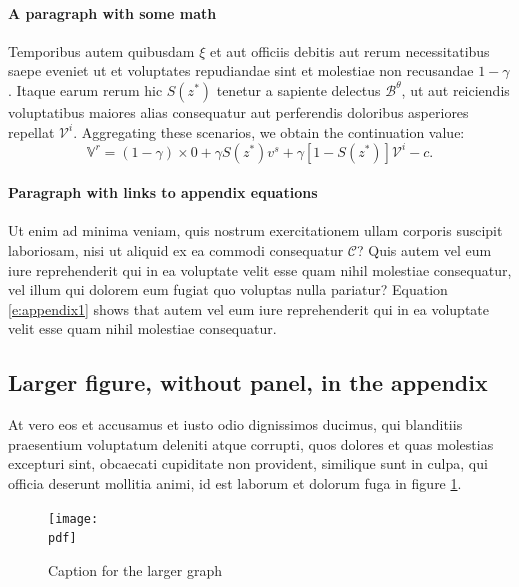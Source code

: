\documentclass[letterpaper,12pt,leqno]{article}
\newcommand{\pdf}{figures.pdf}
\begin{document}
\paragraph{A paragraph with some math} Temporibus autem quibusdam $\xi$ et aut officiis debitis aut rerum necessitatibus saepe eveniet ut et voluptates repudiandae sint et molestiae non recusandae $1-\gamma$. Itaque earum rerum hic $S(z^*)$ tenetur a sapiente delectus $\mathcal{B}^\theta$, ut aut reiciendis voluptatibus maiores alias consequatur aut perferendis doloribus asperiores repellat $\mathcal{V}^i$. Aggregating these scenarios, we obtain the continuation value:
\begin{equation}
\mathbb{V}^r = (1-\gamma) \times 0 +\gamma S(z^*) v^s+\gamma [1-S(z^*)] \mathcal{V}^i-c.
\label{e:appendix1}\end{equation}

\paragraph{Paragraph with links to appendix equations} Ut enim ad minima veniam, quis nostrum exercitationem ullam corporis suscipit laboriosam, nisi ut aliquid ex ea commodi consequatur $\mathcal{C}$? Quis autem vel eum iure reprehenderit qui in ea voluptate velit esse quam nihil molestiae consequatur, vel illum qui dolorem eum fugiat quo voluptas nulla pariatur? Equation \eqref{e:appendix1} shows that autem vel eum iure reprehenderit qui in ea voluptate velit esse quam nihil molestiae consequatur.

\subsection{Larger figure, without panel, in the appendix} 

At vero eos et accusamus et iusto odio dignissimos ducimus, qui blanditiis praesentium voluptatum deleniti atque corrupti, quos dolores et quas molestias excepturi sint, obcaecati cupiditate non provident, similique sunt in culpa, qui officia deserunt mollitia animi, id est laborum et dolorum fuga in figure \ref{f:appendix1}.

\begin{figure}[t]
\texttt{[image: \\pdf]}
\caption{Caption for the larger graph}
\label{f:appendix1}\end{figure}
\end{document}
